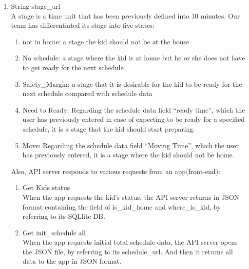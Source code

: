 \documentclass[conference]{IEEEtran}
\begin{document}
\begin{enumerate}[label=\arabic*.]
\begin{enumerate}[label=\arabic*.]
\begin{enumerate}[label=\alph*.]
\begin{enumerate}[label=\roman*.]
        \end{enumerate}
    \item {\large{String stage\_url}} \\
    A stage is a time unit that has been previously defined into 10 minutes. Our team has differentiated its stage into five states: \\
        \begin{enumerate}[label=\roman*.]
            \item {\large{not in home: a stage the kid should not be at the house }} \\
            \item {\large{No schedule: a stage where the kid is at home but he or she does not have to get ready for the next schedule }} \\
            \item {\large{Safety\_Margin: a stage that it is desirable for the kid to be ready for the next schedule compared with schedule data }} \\
            \item {\large{Need to Ready: Regarding the schedule data field “ready time”, which the user has previously entered in case of expecting to be ready for a specified schedule, it is a stage that the kid should start preparing. }} \\
            \item {\large{Move: Regarding the schedule data field “Moving Time”, which the user has previously entered, it is a stage where the kid should not be home. }} \\
        \end{enumerate}
    Also, API server responds to various requests from an app(front-end):\\
        \begin{enumerate}[label=\roman*.]
            \item {\large{Get Kids status }}\\
            When the app requests the kid’s status, the API server returns in JSON format containing the field of is\_kid\_home and where\_is\_kid, by referring to its SQLlite DB. \\
            \item {\large{Get init\_schedule all }} \\
            When the app requests initial total schedule data, the API server opens the JSON file, by referring to its schedule\_url. And then it returns all data to the app in JSON format. \\

\end{enumerate}
\end{enumerate}
\end{enumerate}
\end{enumerate}
\end{document}
